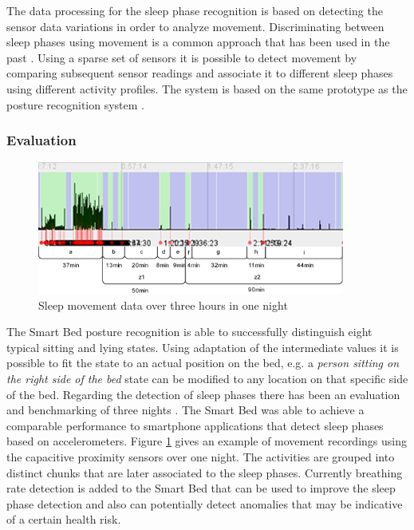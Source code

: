 The data processing for the sleep phase recognition is based on detecting the sensor data variations in order to analyze movement. Discriminating between sleep phases using movement is a common approach that has been used in the past \cite{salmi86}. Using a sparse set of sensors it is possible to detect movement by comparing subsequent sensor readings and associate it to different sleep phases using different activity profiles. The system is based on the same prototype as the posture recognition system \cite{Djakow2013movibed}.
 
\subsubsection{Evaluation}
\begin{figure}[h]
\centering
\includegraphics[width=0.9\textwidth]{images/smartbed_sleepphase}
\caption{Sleep movement data over three hours in one night \cite{Djakow2013movibed}}
\label{fig:smartbed_sleepphase}
\end{figure}
The Smart Bed posture recognition is able to successfully distinguish eight typical sitting and lying states. Using adaptation of the intermediate values it is possible to fit the state to an actual position on the bed, e.g. a \emph{person sitting on the right side of the bed} state can be modified to any location on that specific side of the bed. 
Regarding the detection of sleep phases there has been an evaluation and benchmarking of three nights \cite{Djakow2013movibed}. The Smart Bed was able to achieve a comparable performance to smartphone applications that detect sleep phases based on accelerometers. Figure \ref{fig:smartbed_sleepphase} gives an example of movement recordings using the capacitive proximity sensors over one night. The activities are grouped into distinct chunks that are later associated to the sleep phases. Currently breathing rate detection is added to the Smart Bed that can be used to improve the sleep phase detection and also can potentially detect anomalies that may be indicative of a certain health risk.

